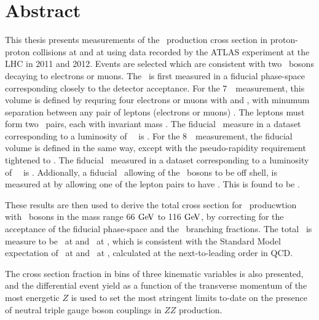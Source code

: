 \chapter*{Abstract}
This thesis presents measurements of the \ZZ\ production cross section in proton-proton collisions
at  and at  using data recorded by the ATLAS experiment 
at the LHC in 2011 and 2012.  
Events are selected which are consistent with two \Z\ bosons decaying to
electrons or muons. The \cx\ is first measured in a fiducial phase-space corresponding
closely to the detector acceptance. For the 7~\tev\ measurement, this volume is
defined by requring four electrons or muons with  and ,
with minumum separation between any pair of leptons (electrons or muons) . The leptons
must form two \ossf\ pairs, each with invariant mass \sstooos. The fiducial \cx\
measure in a dataset corresponding to a luminosity of
\LumiPassGRLTwentyEleven~\ifb\ is \ZZSevenTeVFiducialCrossSectionZZLLLL. For the 8~\tev\ measurement, the fiducial
volume is defined in the same way, except with the pseudo-rapidity requirement
tightened to \modetalt{2.7}. The fiducial \cx\
measured in a dataset corresponding to a luminosity of
\LumiPassGRLTwentyTwelve~\ifb\ is \ZZEightTeVFiducialCrossSectionZZLLLL.
Addionally, a fiducial \cx\ allowing of the \Z\ bosons to be off shell, is measured at
\sqrtseq{7} by
allowing one of the lepton pairs to have \mllgtt. This is found to be \ZZSevenTeVFiducialCrossSectionZZsLLLL.

These results are then used to derive the total cross section for \ZZ\
producwtion with \Z\ bosons in the mass range 66$\GeV$ to 116$\GeV$, by
correcting for the acceptance of the fiducial phase-space and the \Zll\
branching fractions. The total \cx\ is measure to be
\ZZSevenTeVTotalCrossSection\ at \sqrtseq{7} and \ZZEightTeVTotalCrossSection\ at
\sqrtseq{8}, which is consistent with the Standard Model
expectation of \ZZSevenTeVTheoryTotalCrossSection\ at \sqrtseq{7} and \ZZEightTeVTheoryTotalCrossSection\ at
\sqrtseq{8}, calculated at the next-to-leading order in QCD.

The cross section fraction in bins of three kinematic variables is also presented, and 
the differential event yield as a function of the transverse momentum of the most energetic $Z$ 
is used to set the most stringent limits to-date on the presence of 
neutral triple gauge boson couplings in $ZZ$ production.
